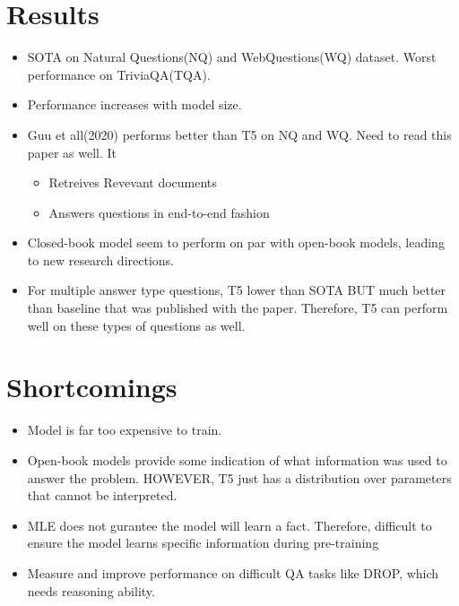 \documentclass[a4paper]{article}
\begin{document}
\section{Results}
\begin{itemize}
    \item SOTA on Natural Questions(NQ) and WebQuestions(WQ) dataset. Worst performance on TriviaQA(TQA).
    \item Performance increases with model size.
    \item Guu et all(2020) performs better than T5 on NQ and WQ. Need to read this paper as well. It 
    \begin{itemize}
        \item Retreives Revevant documents
        \item Answers questions in end-to-end fashion
    \end{itemize}
    \item Closed-book model seem to perform on par with open-book models, leading to new research directions.
    \item For multiple answer type questions, T5 lower than SOTA BUT much better than baseline that was published with the paper. Therefore, T5 can perform well on these types of questions as well.
\end{itemize}
\section{Shortcomings}
\begin{itemize}
    \item Model is far too expensive to train.
    \item Open-book models provide some indication of what information was used to answer the problem. HOWEVER, T5 just has a distribution over parameters that cannot be interpreted.
    \item MLE does not gurantee the model will learn a fact. Therefore, difficult to ensure the model learns specific information during pre-training
    \item Measure and improve performance on difficult QA tasks like DROP, which needs reasoning ability.
\end{itemize}
\end{document}
